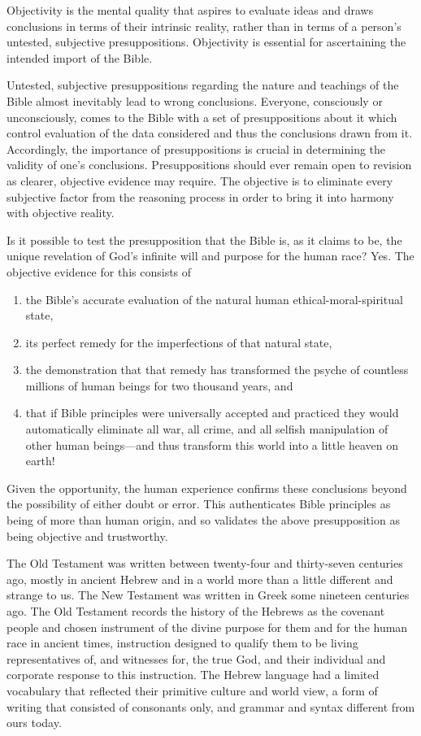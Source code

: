 Objectivity is the mental quality that aspires to evaluate ideas and draws
conclusions in terms of their intrinsic reality, rather than in terms of a
person's untested, subjective presuppositions. Objectivity is essential for
ascertaining the intended import of the Bible.

Untested, subjective presuppositions regarding the nature and teachings of
the Bible almost inevitably lead to wrong conclusions. Everyone, consciously
or unconsciously, comes to the Bible with a set of presuppositions about it
which control evaluation of the data considered and thus the conclusions
drawn from it. Accordingly, the importance of presuppositions is crucial in
determining the validity of one's conclusions. Presuppositions should ever
remain open to revision as clearer, objective evidence may require. The
objective is to eliminate every subjective factor from the reasoning process
in order to bring it into harmony with objective reality.

Is it possible to test the presupposition that the Bible is, as it claims to
be, the unique revelation of God's infinite will and purpose for the human
race? Yes. The objective evidence for this consists of 
\begin{enumerate}
    \item the Bible's
accurate evaluation of the natural human ethical-moral-spiritual state, 
    \item its perfect remedy for the imperfections of that natural state,
    \item the
demonstration that that remedy has transformed the psyche of countless
millions of human beings for two thousand years, and
    \item that if Bible
principles were universally accepted and practiced they would automatically
eliminate all war, all crime, and all selfish manipulation of other human
beings---and thus transform this world into a little heaven on earth!
\end{enumerate}
Given
the opportunity, the human experience confirms these conclusions beyond the
possibility of either doubt or error. This authenticates Bible principles as
being of more than human origin, and so validates the above presupposition
as being objective and trustworthy.

The Old Testament was written between twenty-four and thirty-seven centuries
ago, mostly in ancient Hebrew and in a world more than a little different
and strange to us. The New Testament was written in Greek some nineteen
centuries ago. The Old Testament records the history of the Hebrews as the 
covenant people and chosen instrument of the divine purpose for them and for
the human race in ancient times, instruction designed to qualify them to be
living representatives of, and witnesses for, the true God, and their
individual and corporate response to this instruction. The Hebrew language
had a limited vocabulary that reflected their primitive culture and world
view, a form of writing that consisted of consonants only, and grammar and
syntax different from ours today.


